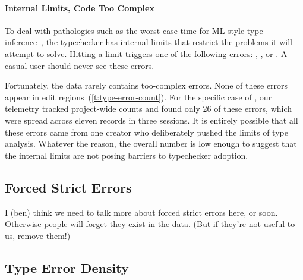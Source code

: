 \documentclass[english,submission,cleveref]{programming}
\begin{document}
\paragraph{Internal Limits, Code Too Complex}

To deal with pathologies such as the worst-case time for ML-style type
inference~\cite{m-popl-1990,ktu-caap-1990}, the typechecker
has internal limits that restrict the problems it will attempt to solve.
Hitting a limit triggers one of the following errors:
,
, or
.
A casual user should never see these errors.

Fortunately, the data rarely contains too-complex errors.
None of these errors appear in edit regions~(\cref{t:type-error-count}).
For the specific case of , our telemetry tracked project-wide
counts and found only 26 of these errors, which were spread across eleven
records in three sessions.
It is entirely possible that all these errors came from one creator who
deliberately pushed the limits of type analysis.
Whatever the reason, the overall number is low enough to suggest that the
internal limits are not posing barriers to typechecker adoption.


\subsection{Forced Strict Errors}

\FILL{} I (ben) think we need to talk more about forced strict errors here, or soon.
Otherwise people will forget they exist in the data.
(But if they're not useful to us, remove them!)


\subsection{Type Error Density}
\end{document}
